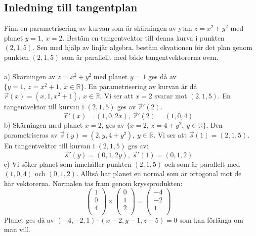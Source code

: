 \documentclass{report}
\begin{document}
\vspace{20pt}
\subsection{Inledning till tangentplan}
\ex{}
{
Finn en parametrisering av kurvan som är skärningen av ytan $ z = x^2+y^2 $ med planet $ y = 1, \: x = 2 $. Bestäm en tangentvektor till denna kurva i punkten $ (2,1,5) $. Sen med hjälp av linjär algebra, bestäm ekvationen för det plan genom punkten $ (2,1,5) $ som är parallellt med både tangentvektorerna ovan.\\\\

a) Skärningen av $ z = x^2+y^2 $ med planet $ y = 1 $ ges då av $ \{ y = 1, \: z = x^2+1, \: x \in \mathbb{R} \} $. En parametrisering av kurvan är då $ \vec{r} (x) =  (x,1,x^2+1), \: x \in \mathbb{R} $. Vi ser att $ x = 2 $ svarar mot $ (2,1,5) $. En tangentvektor till kurvan i $ (2,1,5) $ ges av $ \vec{r}' (2) $.
\begin{equation*}
\vec{r} '(x) = (1, 0, 2x),\: \vec{r} ' (2) = (1,0,4)
\end{equation*}
\noindent
b) Skärningen med planet $ x = 2 $, ges av $ \{ x = 2, \: z = 4+y^2, \: y \in \mathbb{R} \} $. Den parametriseras av $ \vec{s} (y) = (2,y,4+y^2), \: y \in \mathbb{R} $. Vi ser att $ \vec{s} (1) = (2,1,5) $. En tangentvektor till kurvan i $ (2,1,5) $ ges av:
\begin{equation*}
\vec{s} ' (y) = (0,1,2y), \: \vec{s} '(1) = (0,1,2)
\end{equation*}
\noindent
c) Vi söker planet som innehåller punkten $ (2,1,5) $ och som är parallelt med $ (1,0,4) $ och $ (0,1,2) $. Alltså har planet en normal som är ortogonal mot de här vektorerna. Normalen tas fram genom kryssprodukten:
\begin{equation*}
\begin{pmatrix}
	1 \\
	0 \\
	4 \\
\end{pmatrix}
\times
\begin{pmatrix}
	0 \\
	1 \\
	2 \\
\end{pmatrix}
=
\begin{pmatrix}
	-4 \\
	-2 \\
	1 \\
\end{pmatrix}
\end{equation*}
Planet ges då av $ (-4,-2,1) \cdot (x-2,y-1,z-5) = 0 $ som kan förlänga om man vill. 
}
\end{document}
